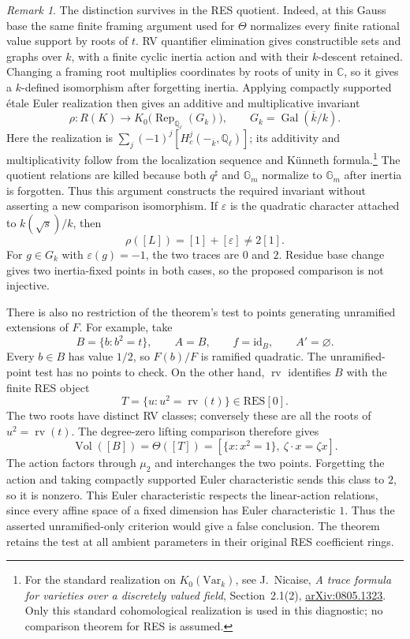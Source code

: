 \documentclass[12pt]{amsart}
\theoremstyle{remark}
\newtheorem{rem}[thm]{Remark}
\theoremstyle{definition}
\newcommand{\C}{\mathds{C}}
\newcommand{\Q}{\mathds{Q}}
\newcommand{\rv}{\operatorname{rv}}
\newcommand{\RES}{\mathrm{RES}}
\numberwithin{equation}{section}
\newcommand{\Gm}{\mathbb G_m}
\newcommand{\Var}{\mathrm{Var}}
\newcommand{\Vol}{\operatorname{Vol}}
\theoremstyle{plain}
\begin{document}
\begin{rem}
{The distinction survives in the RES quotient.
Indeed, at this Gauss base the same finite framing argument
used for $\Theta$ normalizes every finite rational value
support by roots of $t$.
RV quantifier elimination gives constructible sets and graphs
over $k$, with a finite cyclic inertia action and with their
$k$-descent retained.
Changing a framing root multiplies coordinates by roots of
unity in $\C$, so it gives a $k$-defined isomorphism after
forgetting inertia.
Applying compactly supported \'etale Euler realization then
gives an additive and multiplicative invariant
\[
 \rho:R(K)\longrightarrow
 K_0\bigl(\operatorname{Rep}_{\Q_\ell}(G_k)\bigr),
 \qquad G_k=\operatorname{Gal}(\overline{k}/k).
\]
Here the realization is
$\sum_j(-1)^j[H_c^j(-_{\overline{k}},\Q_\ell)]$;
its additivity and multiplicativity follow from the
localization sequence and K\"unneth formula.\footnote{For
the standard realization on $K_0(\Var_k)$, see
J.~Nicaise, \emph{A trace formula for varieties over a
discretely valued field}, Section~2.1(2),
\href{https://arxiv.org/pdf/0805.1323}{arXiv:0805.1323}.
Only this standard cohomological realization is used in this
diagnostic; no comparison theorem for RES is assumed.}
The quotient relations are killed because both
$q^\sharp$ and $\Gm$ normalize to $\Gm$ after inertia is
forgotten. Thus this argument constructs the required
invariant without asserting a new comparison isomorphism.
If $\varepsilon$ is the quadratic character attached to
$k(\sqrt{s})/k$, then
\[
 \rho([L])=[1]+[\varepsilon]\ne 2[1].
\]
For $g\in G_k$ with $\varepsilon(g)=-1$, the two traces
are $0$ and $2$. Residue base change gives two inertia-fixed
points in both cases, so the proposed comparison is not
injective.

There is also no restriction of the theorem's test to points
generating unramified extensions of $F$.
For example, take
\[
 B=\{b:b^2=t\},\qquad A=B,\qquad f=\mathrm{id}_B,
 \qquad A'=\varnothing.
\]
Every $b\in B$ has value $1/2$, so $F(b)/F$ is ramified
quadratic. The unramified-point test has no points to check.
On the other hand, $\rv$ identifies $B$ with the finite
RES object
\[
 T=\{u:u^2=\rv(t)\}\in\RES[0].
\]
The two roots have distinct RV classes; conversely these are
all the roots of $u^2=\rv(t)$.
The degree-zero lifting comparison therefore gives
\[
 \Vol([B])=\Theta([T])
   =[\{x:x^2=1\},\ \zeta\cdot x=\zeta x].
\]
The action factors through $\mu_2$ and interchanges the two
points. Forgetting the action and taking compactly supported
Euler characteristic sends this class to $2$, so it is
nonzero. This Euler characteristic respects the linear-action
relations, since every affine space of a fixed dimension has
Euler characteristic $1$.
Thus the asserted unramified-only criterion would give a
false conclusion. The theorem retains the test at all
ambient parameters in their original RES coefficient rings.
}
\end{rem}
\end{document}
